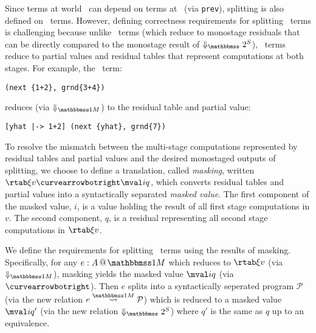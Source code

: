 \begin{abstrsyn}
Since terms at world \bbtwo\ can depend on terms at \bbonem\ (via
\texttt{prev}), splitting is also defined on \bbonem\ terms.  However,
defining correctness requirements for splitting \bbonem\ terms is
challenging because unlike \bbtwo\ terms (which reduce to monostage
residuals that can be directly compared to the monostage result of
$\sepredtwosym$), \bbonem\ terms reduce to partial values and residual
tables that represent computations at both stages.
For example, the \bbonem\ term:
\begin{lstlisting}
(next {1+2}, grnd{3+4})
\end{lstlisting}
reduces (via $\redonesym$) to the residual table and partial value:
\begin{lstlisting}
[yhat |-> 1+2] (next {yhat}, grnd{7})
\end{lstlisting}

To resolve the mismatch between the multi-stage computations
represented by residual tables and partial values and the desired monostaged
outputs of splitting,
we choose to define a translation, called {\em masking}, written $\rtab \xi v \vsplito \mval i q$,
which converts residual tables and partial values into a syntactically separated {\em masked value}.
The first component of the masked value, $i$, is a value holding the
result of all first stage computations in $v$.  The second component,
$q$, is a residual representing all second stage computations in $\rtab
\xi v$.



We define the requirements for splitting \bbonem\ terms using the
results of masking. Specifically, for any $\colmix e A$ which reduces
to $\rtab \xi v$ (via $\redonesym$), masking yields the masked value
$\mval i q$ (via $\vsplito$).  Then $e$ splits into a syntactically
seperated program $\mathcal{P}$ (via the new relation $e \splitonesym
\mathcal{P}$) which is reduced to a masked value $\mval i {q'}$ (via
the new relation $\sepredtwosym$) where $q'$ is the same as $q$ up to
an equivalence.


\end{abstrsyn}
